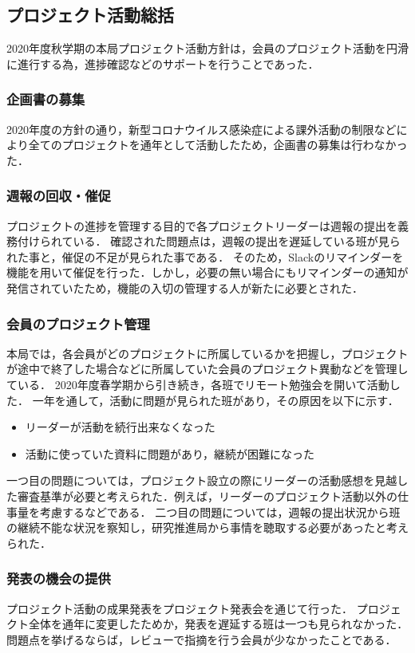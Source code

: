 \subsection*{プロジェクト活動総括}


2020年度秋学期の本局プロジェクト活動方針は，会員のプロジェクト活動を円滑に進行する為，進捗確認などのサポートを行うことであった．

\subsubsection*{企画書の募集}

2020年度の方針の通り，新型コロナウイルス感染症による課外活動の制限などにより全てのプロジェクトを通年として活動したため，企画書の募集は行わなかった．

\subsubsection*{週報の回収・催促}

プロジェクトの進捗を管理する目的で各プロジェクトリーダーは週報の提出を義務付けられている．
確認された問題点は，週報の提出を遅延している班が見られた事と，催促の不足が見られた事である．
そのため，Slackのリマインダーを機能を用いて催促を行った．しかし，必要の無い場合にもリマインダーの通知が発信されていたため，機能の入切の管理する人が新たに必要とされた．

\subsubsection*{会員のプロジェクト管理}

本局では，各会員がどのプロジェクトに所属しているかを把握し，プロジェクトが途中で終了した場合などに所属していた会員のプロジェクト異動などを管理している．
2020年度春学期から引き続き，各班でリモート勉強会を開いて活動した．
一年を通して，活動に問題が見られた班があり，その原因を以下に示す．
\begin{itemize}
\item リーダーが活動を続行出来なくなった
\item 活動に使っていた資料に問題があり，継続が困難になった
\end{itemize}
一つ目の問題については，プロジェクト設立の際にリーダーの活動感想を見越した審査基準が必要と考えられた．例えば，リーダーのプロジェクト活動以外の仕事量を考慮するなどである．
二つ目の問題については，週報の提出状況から班の継続不能な状況を察知し，研究推進局から事情を聴取する必要があったと考えられた．

\subsubsection*{発表の機会の提供}
プロジェクト活動の成果発表をプロジェクト発表会を通じて行った．
プロジェクト全体を通年に変更したためか，発表を遅延する班は一つも見られなかった．
問題点を挙げるならば，レビューで指摘を行う会員が少なかったことである．
